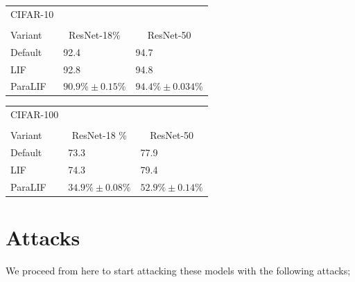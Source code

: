 \documentclass[conference]{IEEEtran}
\begin{document}
\begin{table}[ht]
\centering
\begin{tabular}{ l l l }
  CIFAR-10 \\
  \\
  Variant & \multicolumn{1}{c}{ResNet-18\%} & \multicolumn{1}{c}{ResNet-50} \\
  \midrule
  Default & \num{92.4} & \num{94.7} \\
  LIF & \num{92.8} & \num{94.8} \\
  ParaLIF & $90.9\% \pm 0.15\%$ & $94.4\% \pm 0.034\%$ \\
  \bottomrule
\end{tabular}
\end{table}

\begin{table}[ht]
\centering
\begin{tabular}{ l l l }
  CIFAR-100 \\
  \\
  Variant & \multicolumn{1}{c}{ResNet-18 \%} & \multicolumn{1}{c}{ResNet-50} \\
  \midrule
  Default & \num{73.3} & \num{77.9} \\
  LIF & \num{74.3} & \num{79.4} \\
  ParaLIF & $34.9\% \pm 0.08\%$ & $52.9\% \pm 0.14\%$ \\
  \bottomrule
\end{tabular}
\end{table}

\section{Attacks}
We proceed from here to start attacking these models with the following attacks;
\end{document}

